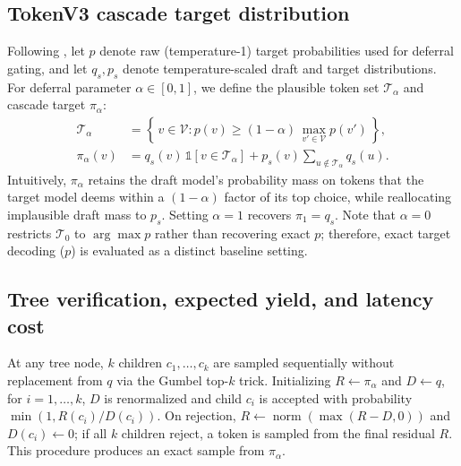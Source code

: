 \documentclass[10pt]{article}
\DeclareMathOperator{\norm}{norm}
\begin{document}
\subsection{TokenV3 cascade target distribution}
Following \citet{narasimhan2025faster}, let $p$ denote raw (temperature-1) target probabilities used for deferral gating, and let $q_s, p_s$ denote temperature-scaled draft and target distributions. For deferral parameter $\alpha \in [0, 1]$, we define the plausible token set $\mathcal{T}_\alpha$ and cascade target $\pi_\alpha$:
\begin{align}
  \mathcal{T}_\alpha &= \left\{\, v \in \mathcal{V} : p(v) \ge (1 - \alpha)\,\max_{v' \in \mathcal{V}} p(v') \,\right\}, \\
  \pi_\alpha(v) &= q_s(v)\,\mathbb{1}[v \in \mathcal{T}_\alpha] + p_s(v) \sum_{u \notin \mathcal{T}_\alpha} q_s(u).
\end{align}
Intuitively, $\pi_\alpha$ retains the draft model's probability mass on tokens that the target model deems within a $(1-\alpha)$ factor of its top choice, while reallocating implausible draft mass to $p_s$. Setting $\alpha = 1$ recovers $\pi_1 = q_s$. Note that $\alpha = 0$ restricts $\mathcal{T}_0$ to $\arg\max p$ rather than recovering exact $p$; therefore, exact target decoding ($p$) is evaluated as a distinct baseline setting.

\subsection{Tree verification, expected yield, and latency cost}
At any tree node, $k$ children $c_1, \dots, c_k$ are sampled sequentially without replacement from $q$ via the Gumbel top-$k$ trick. Initializing $R \leftarrow \pi_\alpha$ and $D \leftarrow q$, for $i = 1, \dots, k$, $D$ is renormalized and child $c_i$ is accepted with probability $\min(1, R(c_i)/D(c_i))$. On rejection, $R \leftarrow \norm(\max(R - D, 0))$ and $D(c_i) \leftarrow 0$; if all $k$ children reject, a token is sampled from the final residual $R$. This procedure produces an exact sample from $\pi_\alpha$.
\end{document}
